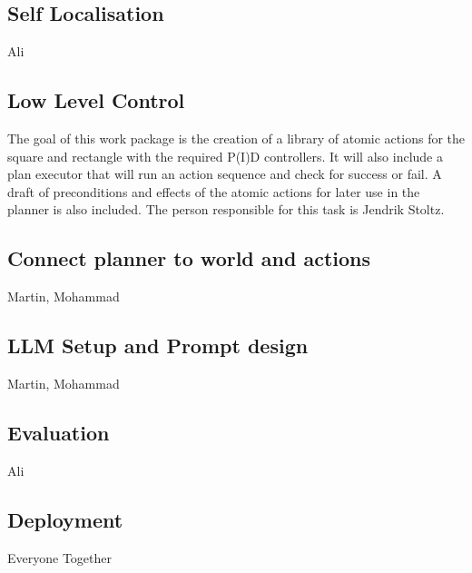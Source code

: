 \documentclass{article}
\begin{document}
\subsection{Self Localisation}
Ali

\subsection{Low Level Control}
The goal of this work package is the creation of a library of atomic actions for the square and rectangle with the required P(I)D controllers. It will also include a plan executor that will run an action sequence and check for success or fail.
A draft of preconditions and effects of the atomic actions for later use in the planner is also included. The person responsible for this task is Jendrik Stoltz.

\subsection{Connect planner to world and actions}
Martin, Mohammad
\subsection{LLM Setup and Prompt design}
Martin, Mohammad
\subsection{Evaluation}
Ali
\subsection{Deployment}
Everyone Together
\end{document}
